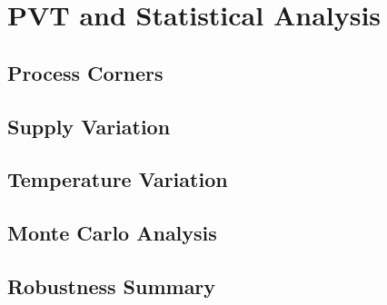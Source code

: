 
\section{PVT and Statistical Analysis}
\label{sec:pvt}

\subsection{Process Corners}



\subsection{Supply Variation}



\subsection{Temperature Variation}



\subsection{Monte Carlo Analysis}



\subsection{Robustness Summary}

